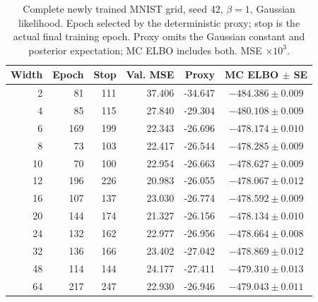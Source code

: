 \begin{table}[H]
\caption{Complete newly trained MNIST grid, seed 42, $\beta=1$, Gaussian likelihood. Epoch selected by the deterministic proxy; stop is the actual final training epoch. Proxy omits the Gaussian constant and posterior expectation; MC ELBO includes both. MSE $\times10^3$.}\label{tab:mcgrid}
\small
\setlength{\tabcolsep}{3pt}
\begin{tabular*}{\textwidth}{@{\extracolsep{\fill}}rrrrrc@{}}
\toprule
Width & Epoch & Stop & Val. MSE & Proxy & MC ELBO $\pm$ SE \\
\midrule
2 & 81 & 111 & 37.406 & -34.647 & $-484.386 \pm 0.009$ \\
4 & 85 & 115 & 27.840 & -29.304 & $-480.108 \pm 0.009$ \\
6 & 169 & 199 & 22.343 & -26.696 & $-478.174 \pm 0.010$ \\
8 & 73 & 103 & 22.417 & -26.544 & $-478.285 \pm 0.009$ \\
10 & 70 & 100 & 22.954 & -26.663 & $-478.627 \pm 0.009$ \\
12 & 196 & 226 & 20.983 & -26.055 & $-478.067 \pm 0.012$ \\
16 & 107 & 137 & 23.030 & -26.774 & $-478.592 \pm 0.009$ \\
20 & 144 & 174 & 21.327 & -26.156 & $-478.134 \pm 0.010$ \\
24 & 132 & 162 & 22.977 & -26.956 & $-478.664 \pm 0.008$ \\
32 & 136 & 166 & 23.402 & -27.042 & $-478.869 \pm 0.012$ \\
48 & 114 & 144 & 24.177 & -27.411 & $-479.310 \pm 0.013$ \\
64 & 217 & 247 & 22.930 & -26.946 & $-479.043 \pm 0.011$ \\
\bottomrule\end{tabular*}
\end{table}
